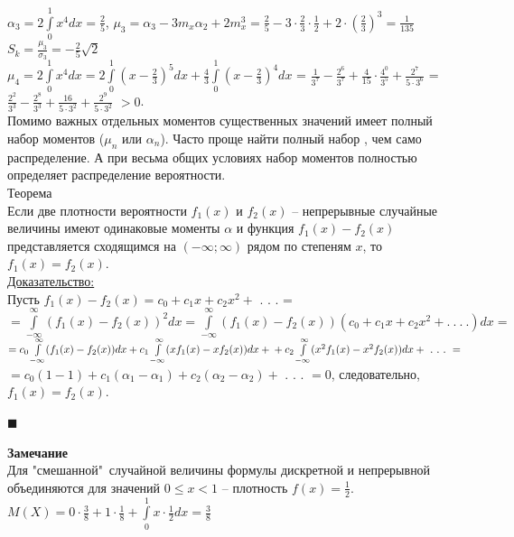 \documentclass[russian, 12pt, fleqn]{article}
\begin{document}
$\alpha_3 = 2\int\limits_{0}^{1}x^4dx=\frac{2}{5}$, $\mu_3 = \alpha_3 - 3m_x\alpha_2 + 2m_x^3 = \frac{2}{5} - 3\cdot\frac{2}{3}\cdot\frac{1}{2} + 2 \cdot (\frac{2}{3})^3 = \frac{1}{135}$\\
$S_k = \frac{\mu_3}{\sigma_3} = -\frac{2}{5}\sqrt2$\\
$\mu_4 = 2\int\limits_0^1x^4dx=2\int\limits_0 ^1(x-\frac{2}{3})^5dx + \frac{4}{3}\int\limits_{0}^{1}(x-\frac{2}{3})^4dx$ = $\frac{1}{3^7} - \frac{2^6}{3^7} + \frac{4}{15} \cdot \frac{4^0}{3^5} + \frac{2^7}{5\cdot3^6}$ = $\frac{2^2}{3^3} - \frac{2^8}{3^3} + \frac{16}{5\cdot3^2} + \frac{2^9}{5\cdot3^2}$ $>0$.\\
Помимо важных отдельных моментов существенных значений имеет полный набор моментов ($\mu_n$ или $\alpha_n$). Часто проще найти полный набор %
, чем само распределение. А при весьма общих условиях набор моментов полностью определяет распределение вероятности.\\
$\textbf{Теорема}$\\
Если две плотности вероятности $f_1(x)$ и $f_2(x)$ -- непрерывные случайные величины имеют одинаковые моменты $\alpha$ и функция $f_1(x) - f_2(x)$ представляется сходящимся на $(-\infty;\infty)$ рядом по степеням $x$, то $f_1(x) = f_2(x)$.\\
\underline{Доказательство:}\\
Пусть $f_1(x) - f_2(x)= c_0 + c_1x + c_2x^2 +$ . . . =\\
$=\int\limits_{-\infty}^{\infty} (f_1(x) - f_2(x))^2dx = \int\limits_{-\infty}^{\infty} (f_1(x) - f_2(x))(c_0 + c_1x + c_2x^2 + .\ .\ .\ .)dx=$\\
$=c_0\int\limits_{-\infty}^{\infty}(f_1(x)-f_2(x))dx + c_1\int\limits_{-\infty}^{\infty}(xf_1(x) - xf_2(x))dx +\\ +   c_2\int\limits_{-\infty}^{\infty}(x^2f_1(x) - x^2f_2(x))dx  + \ . \ .\ .\ = $\\
$=c_0(1 - 1) + c_1(\alpha_1-\alpha_1) + c_2(\alpha_2 - \alpha_2) + $ . . . $=0$, следовательно, $f_1(x) = f_2(x)$.
\begin{flushright}\(\blacksquare\)\end{flushright}
\textbf{Замечание\ } \\ 
Для "смешанной"\  случайной величины формулы дискретной и непрерывной объединяются для значений $0\leq x< 1$ -- плотность $f(x) = \frac{1}{2}$.\\
$M(X) = 0\cdot \frac{3}{8} + 1\cdot \frac{1}{8} + \int\limits_{0}^{1}x\cdot \frac{1}{2} dx = \frac{3}{8}$
\end{document}
